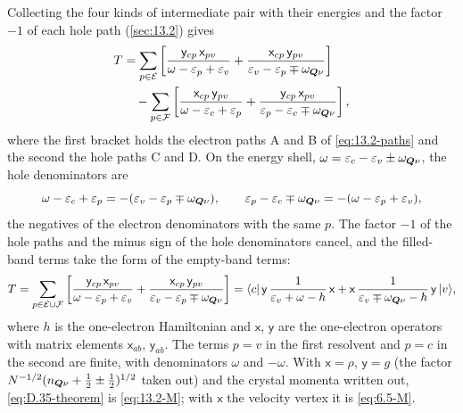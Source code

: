 Collecting the four kinds of intermediate pair with their energies and the factor $-1$ of each hole path (\cref{sec:13.2}) gives
\begin{equation*}
  \begin{aligned}
  T &= \sum_{p\in\mathcal{E}}\left[\frac{\mathsf{y}_{cp}\,\mathsf{x}_{pv}}{\omega - \varepsilon_p + \varepsilon_v} + \frac{\mathsf{x}_{cp}\,\mathsf{y}_{pv}}{\varepsilon_v - \varepsilon_p \mp \omega_{\bm{Q}\nu}}\right] \\
  &\quad - \sum_{p\in\mathcal{F}}\left[\frac{\mathsf{x}_{cp}\,\mathsf{y}_{pv}}{\omega - \varepsilon_c + \varepsilon_p} + \frac{\mathsf{y}_{cp}\,\mathsf{x}_{pv}}{\varepsilon_p - \varepsilon_c \mp \omega_{\bm{Q}\nu}}\right] ,
  \end{aligned}
\end{equation*}
where the first bracket holds the electron paths A and B of \cref{eq:13.2-paths} and the second the hole paths C and D. On the energy shell, $\omega = \varepsilon_c - \varepsilon_v \pm \omega_{\bm{Q}\nu}$, the hole denominators are
\begin{equation*}
  \omega - \varepsilon_c + \varepsilon_p = -(\varepsilon_v - \varepsilon_p \mp \omega_{\bm{Q}\nu}) , \qquad
  \varepsilon_p - \varepsilon_c \mp \omega_{\bm{Q}\nu} = -(\omega - \varepsilon_p + \varepsilon_v) ,
\end{equation*}
the negatives of the electron denominators with the same $p$. The factor $-1$ of the hole paths and the minus sign of the hole denominators cancel, and the filled-band terms take the form of the empty-band terms:
\begin{equation}
  T = \sum_{p\in\mathcal{E}\cup\mathcal{F}}\left[\frac{\mathsf{y}_{cp}\,\mathsf{x}_{pv}}{\omega - \varepsilon_p + \varepsilon_v} + \frac{\mathsf{x}_{cp}\,\mathsf{y}_{pv}}{\varepsilon_v - \varepsilon_p \mp \omega_{\bm{Q}\nu}}\right]
  = \langle c|\,\mathsf{y}\,\frac{1}{\varepsilon_v + \omega - h}\,\mathsf{x} + \mathsf{x}\,\frac{1}{\varepsilon_v \mp \omega_{\bm{Q}\nu} - h}\,\mathsf{y}\,|v\rangle ,
  \label{eq:D.35-theorem}
\end{equation}
where $h$ is the one-electron Hamiltonian and $\mathsf{x}$, $\mathsf{y}$ are the one-electron operators with matrix elements $\mathsf{x}_{ab}$, $\mathsf{y}_{ab}$. The terms $p = v$ in the first resolvent and $p = c$ in the second are finite, with denominators $\omega$ and $-\omega$. With $\mathsf{x} = \rho$, $\mathsf{y} = g$ (the factor $N^{-1/2}(n_{\bm{Q}\nu} + \frac12 \pm \frac12)^{1/2}$ taken out) and the crystal momenta written out, \cref{eq:D.35-theorem} is \cref{eq:13.2-M}; with $\mathsf{x}$ the velocity vertex it is \cref{eq:6.5-M}.


